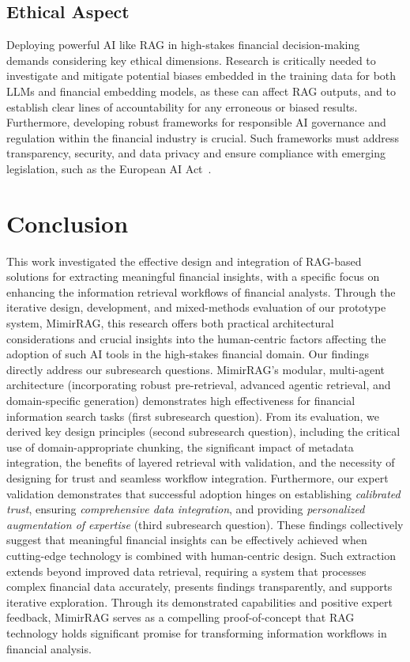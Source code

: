 \documentclass[final,5p,times,twopage,twocolumn,a4paper]{elsarticle}
\begin{document}
\subsection{Ethical Aspect}
Deploying powerful AI like RAG in high-stakes financial decision-making demands considering key ethical dimensions. Research is critically needed to investigate and mitigate potential biases embedded in the training data for both LLMs and financial embedding models, as these can affect RAG outputs, and to establish clear lines of accountability for any erroneous or biased results. Furthermore, developing robust frameworks for responsible AI governance and regulation within the financial industry is crucial. Such frameworks must address transparency, security, and data privacy and ensure compliance with emerging legislation, such as the European AI Act~\cite{europarl2023AIAct}.
%

\section{Conclusion}
\label{chap:conclusion}
This work investigated the effective design and integration of RAG-based solutions for extracting meaningful financial insights, with a specific focus on enhancing the information retrieval workflows of financial analysts. Through the iterative design, development, and mixed-methods evaluation of our prototype system, MimirRAG, this research offers both practical architectural considerations and crucial insights into the human-centric factors affecting the adoption of such AI tools in the high-stakes financial domain. Our findings directly address our subresearch questions. MimirRAG's modular, multi-agent architecture (incorporating robust pre-retrieval, advanced agentic retrieval, and domain-specific generation) demonstrates high effectiveness for financial information search tasks (first subresearch question). From its evaluation, we derived key design principles (second subresearch question), including the critical use of domain-appropriate chunking, the significant impact of metadata integration, the benefits of layered retrieval with validation, and the necessity of designing for trust and seamless workflow integration. Furthermore, our expert validation demonstrates that successful adoption hinges on establishing \textit{calibrated trust}, ensuring \textit{comprehensive data integration}, and providing \textit{personalized augmentation of expertise} (third subresearch question). These findings collectively suggest that meaningful financial insights can be effectively achieved when cutting-edge technology is combined with human-centric design. Such extraction extends beyond improved data retrieval, requiring a system that processes complex financial data accurately, presents findings transparently, and supports iterative exploration. Through its demonstrated capabilities and positive expert feedback, MimirRAG serves as a compelling proof-of-concept that RAG technology holds significant promise for transforming information workflows in financial analysis. 
\end{document}
